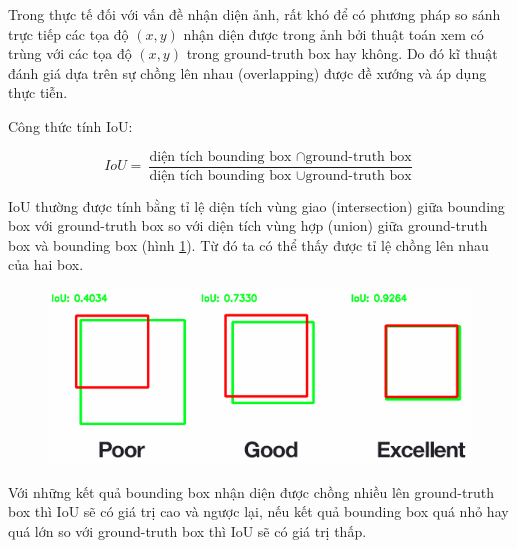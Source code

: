 Trong thực tế đối với vấn đề nhận diện ảnh, rất khó để có phương pháp so sánh trực tiếp các tọa độ $(x, y)$ nhận diện được trong ảnh bởi thuật toán xem có trùng với các tọa độ $(x, y)$ trong ground-truth box hay không. Do đó kĩ thuật đánh giá dựa trên sự chồng lên nhau (overlapping) được đề xướng và áp dụng thực tiễn.

Công thức tính IoU:

\begin{center}
	\begin{equation}
		IoU = \frac{\text{diện tích } \text{bounding box } \cap \text{ground-truth box}}{\text{diện tích } \text{bounding box } \cup \text{ground-truth box}}
	\end{equation}
\end{center}

IoU thường được tính bằng tỉ lệ diện tích vùng giao (intersection) giữa bounding box với ground-truth box so với diện tích vùng hợp (union) giữa ground-truth box và bounding box (hình \ref{chap2:iou_cal}). Từ đó ta có thể thấy được tỉ lệ chồng lên nhau của hai box.

\begin{center}
\begin{figure}[H]
    \centering
    \includegraphics[width=0.7\columnwidth]{images/chap2/iou.png}
    \label{chap2:iou_cal}
    \end{figure}
\end{center}

Với những kết quả bounding box nhận diện được chồng nhiều lên ground-truth box thì IoU sẽ có giá trị cao và ngược lại, nếu kết quả bounding box quá nhỏ hay quá lớn so với ground-truth box thì IoU sẽ có giá trị thấp.

